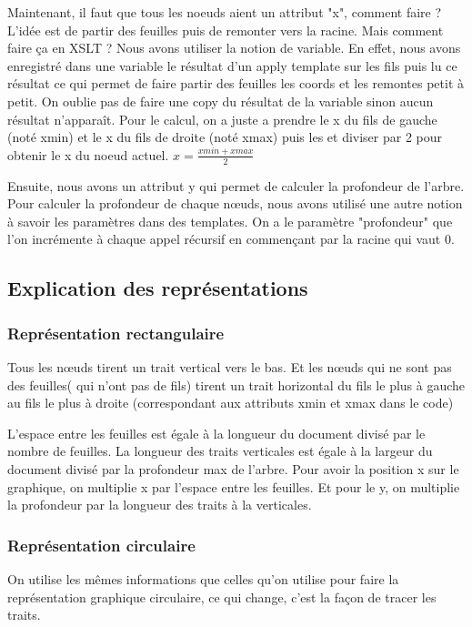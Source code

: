 \documentclass{article}
\begin{document}
Maintenant, il faut que tous les noeuds aient un attribut "x", comment faire ? L'idée est de partir des feuilles puis de remonter vers la racine. Mais comment faire ça en XSLT ?
Nous avons utiliser la notion de variable. En effet, nous avons enregistré dans une variable le résultat d'un apply template sur les fils puis lu ce résultat ce qui permet de faire partir des feuilles les coords et les remontes petit à petit. On oublie pas de faire une copy du résultat de la variable sinon aucun résultat n’apparaît. Pour le calcul, on a juste a prendre le x du fils de gauche (noté xmin) et le x du fils de droite (noté xmax) puis les  et diviser par 2 pour obtenir le x du noeud actuel.
$ x = \frac{xmin + xmax}{2} $  

Ensuite, nous avons un attribut y qui permet de calculer la profondeur de l'arbre. Pour calculer la profondeur de chaque nœuds, nous avons utilisé une autre notion à savoir les paramètres dans des templates. On a le paramètre "profondeur" que l'on incrémente à chaque appel récursif en commençant par la racine qui vaut 0.

\subsection{Explication des représentations }
\subsubsection{Représentation rectangulaire}
Tous les nœuds tirent un trait vertical vers le bas. Et les nœuds qui ne sont pas des feuilles( qui n'ont pas de fils) tirent un trait horizontal du fils le plus à gauche au fils le plus à droite (correspondant aux attributs xmin et xmax dans le code)

L'espace entre les feuilles est égale à la longueur du document divisé par le nombre de feuilles.
La longueur des traits verticales est égale à la largeur du document divisé par la profondeur max de l'arbre.
Pour avoir la position x sur le graphique, on multiplie x par l'espace entre les feuilles. Et pour le y, on multiplie la profondeur par la longueur des traits à la verticales.

\subsubsection{Représentation circulaire}

On utilise les mêmes informations que celles qu'on utilise pour faire la représentation graphique circulaire, ce qui change, c'est la façon de tracer les traits.
 
\end{document}
